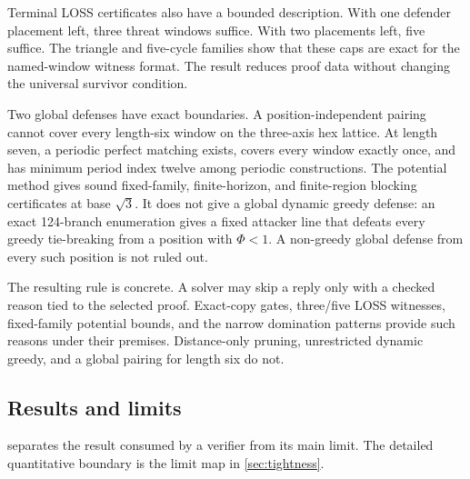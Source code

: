 Terminal LOSS certificates also have a bounded description.  With one
defender placement left, three threat windows suffice.  With two placements
left, five suffice.  The triangle and five-cycle families show that these
caps are exact for the named-window witness format.  The result reduces proof
data without changing the universal survivor condition.

Two global defenses have exact boundaries.  A position-independent pairing
cannot cover every length-six window on the three-axis hex lattice.  At
length seven, a periodic perfect matching exists, covers every window exactly
once, and has minimum period index twelve among periodic constructions.  The
potential method gives sound fixed-family, finite-horizon, and finite-region
blocking certificates at base $\sqrt3$.  It does not give a global dynamic
greedy defense: an exact 124-branch enumeration gives a fixed attacker line
that defeats every greedy tie-breaking from a position with $\Phi<1$.  A
non-greedy global defense from every such position is not ruled out.

The resulting rule is concrete.  A solver may skip a reply only with a
checked reason tied to the selected proof.  Exact-copy gates, three/five LOSS
witnesses, fixed-family potential bounds, and the narrow domination patterns
provide such reasons under their premises.  Distance-only pruning,
unrestricted dynamic greedy, and a global pairing for length six do not.

\subsection{Results and limits}

 separates the result consumed by a verifier
from its main limit.  The detailed quantitative boundary is the limit map in
\cref{sec:tightness}.

